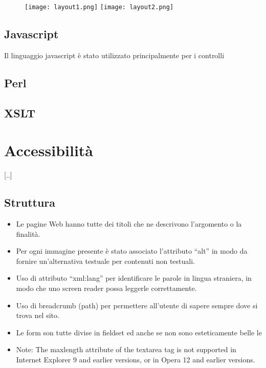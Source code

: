 \documentclass[12pt]{article}
\begin{document}
	\newpage
	
	
	\begin{figure}
	\texttt{[image: layout1.png]}
	\texttt{[image: layout2.png]}
	\hspace{1.5in}
	\end{figure}
	
	\subsection{Javascript}
	
	Il linguaggio javascript è stato utilizzato principalmente per i controlli	
	
	\subsection{Perl}
	
	
	\subsection{XSLT}


\section{Accessibilità}
[..]
	\subsection{Struttura}
	\begin{itemize}
	\item Le pagine Web hanno tutte dei titoli che ne descrivono l’argomento o la finalità.
	\item Per ogni immagine presente è stato associato l'attributo “alt” in modo da fornire un’alternativa testuale per contenuti non testuali.
	\item Uso di attributo “xml:lang” per identificare le parole in lingua straniera, in modo che uno screen reader possa leggerle correttamente.
	\item Uso di breadcrumb (path) per permettere all’utente di sapere sempre dove si trova nel sito.
	\item Le form son tutte divise in fieldset ed anche se non sono esteticamente belle le
	\item Note: The maxlength attribute of the textarea tag is not supported in Internet Explorer 9 and earlier versions, or in Opera 12 and earlier versions.
	\end{itemize}
\end{document}
